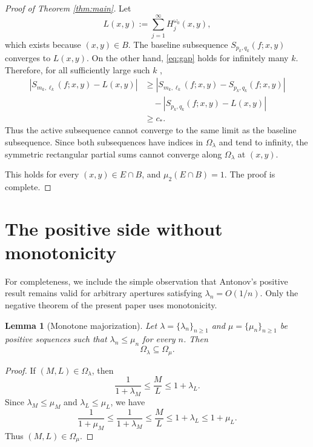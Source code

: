 \documentclass[11pt]{amsart}
\numberwithin{equation}{section}
\newtheorem{lemma}[theorem]{Lemma}
\begin{document}
\begin{proof}[Proof of Theorem \protect\ref{thm:main}]
Let 
\begin{equation*}
L(x,y):=\sum_{j=1}^{\infty}H_j^{\omega_0}(x,y),
\end{equation*}
which exists because $(x,y)\in B$. The baseline subsequence $%
S_{p_k,q_k}(f;x,y)$ converges to $L(x,y)$. On the other hand, \eqref{eq:gap}
holds for infinitely many $k$. Therefore, for all sufficiently large such $k$%
, 
\begin{align*}
\left|S_{m_k,\ell_k}(f;x,y)-L(x,y)\right| &\ge
\left|S_{m_k,\ell_k}(f;x,y)-S_{p_k,q_k}(f;x,y)\right| \\
&\quad -\left|S_{p_k,q_k}(f;x,y)-L(x,y)\right| \\
&\ge c_{\ast}.
\end{align*}
Thus the active subsequence cannot converge to the same limit as the
baseline subsequence. Since both subsequences have indices in $%
\Omega_\lambda $ and tend to infinity, the symmetric rectangular partial
sums cannot converge along $\Omega_\lambda$ at $(x,y)$.

This holds for every $(x,y)\in E\cap B$, and $\mu_2(E\cap B)=1$. The proof
is complete.
\end{proof}

\section{The positive side without monotonicity}

\label{sec:positive-nonmonotone}

For completeness, we include the simple observation that Antonov's positive
result remains valid for arbitrary apertures satisfying $\lambda_n=O(1/n)$.
Only the negative theorem of the present paper uses monotonicity.

\begin{lemma}[Monotone majorization]
\label{lem:monotone-majorization} Let $\lambda=\{\lambda_n\}_{n\ge1}$ and $%
\mu=\{\mu_n\}_{n\ge1}$ be positive sequences such that $\lambda_n\le\mu_n$
for every $n$. Then 
\begin{equation*}
\Omega_\lambda\subseteq \Omega_\mu . 
\end{equation*}
\end{lemma}

\begin{proof}
If $(M,L)\in\Omega_\lambda$, then 
\begin{equation*}
\frac{1}{1+\lambda_M}\le \frac{M}{L}\le 1+\lambda_L . 
\end{equation*}
Since $\lambda_M\le\mu_M$ and $\lambda_L\le\mu_L$, we have 
\begin{equation*}
\frac{1}{1+\mu_M}\le \frac{1}{1+\lambda_M}\le \frac{M}{L}  \le
1+\lambda_L\le 1+\mu_L . 
\end{equation*}
Thus $(M,L)\in\Omega_\mu$.
\end{proof}
\end{document}
